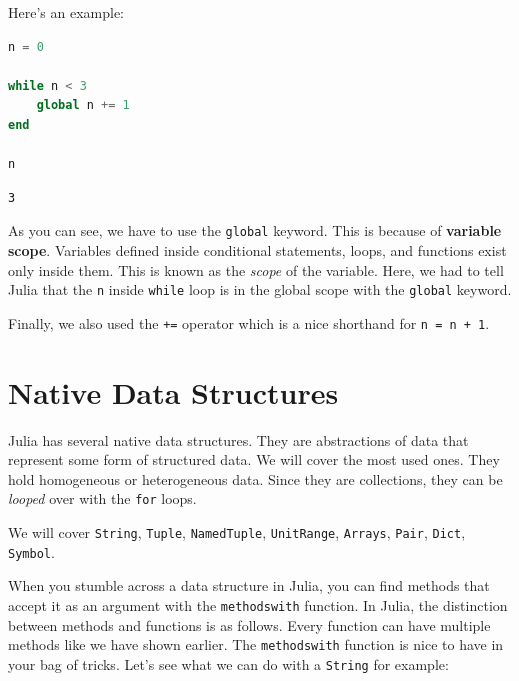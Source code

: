 \documentclass[
  notoc %
]{tufte-book}
\newcommand{\passthrough}[1]{#1}
\begin{document}
Here's an example:

\begin{lstlisting}[language=Julia]
n = 0

while n < 3
    global n += 1
end

n
\end{lstlisting}

\begin{lstlisting}[language=Output]
3
\end{lstlisting}

As you can see, we have to use the \passthrough{\lstinline!global!}
keyword. This is because of \textbf{variable scope}. Variables defined
inside conditional statements, loops, and functions exist only inside
them. This is known as the \emph{scope} of the variable. Here, we had to
tell Julia that the \passthrough{\lstinline!n!} inside
\passthrough{\lstinline!while!} loop is in the global scope with the
\passthrough{\lstinline!global!} keyword.

Finally, we also used the \passthrough{\lstinline!+=!} operator which is
a nice shorthand for \passthrough{\lstinline!n = n + 1!}.

\hypertarget{sec:data_structures}{%
\section{Native Data Structures}\label{sec:data_structures}}

Julia has several native data structures. They are abstractions of data
that represent some form of structured data. We will cover the most used
ones. They hold homogeneous or heterogeneous data. Since they are
collections, they can be \emph{looped} over with the
\passthrough{\lstinline!for!} loops.

We will cover \passthrough{\lstinline!String!},
\passthrough{\lstinline!Tuple!}, \passthrough{\lstinline!NamedTuple!},
\passthrough{\lstinline!UnitRange!}, \passthrough{\lstinline!Arrays!},
\passthrough{\lstinline!Pair!}, \passthrough{\lstinline!Dict!},
\passthrough{\lstinline!Symbol!}.

When you stumble across a data structure in Julia, you can find methods
that accept it as an argument with the
\passthrough{\lstinline!methodswith!} function. In Julia, the
distinction between methods and functions is as follows. Every function
can have multiple methods like we have shown earlier. The
\passthrough{\lstinline!methodswith!} function is nice to have in your
bag of tricks. Let's see what we can do with a
\passthrough{\lstinline!String!} for example:
\end{document}
